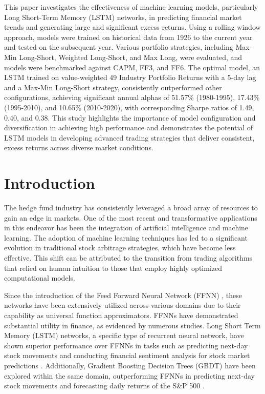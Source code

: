 \documentclass{article}
\begin{document}
This paper investigates the effectiveness of machine learning models, particularly Long Short-Term Memory (LSTM) networks, in predicting financial market trends and generating large and significant excess returns. Using a rolling window approach, models were trained on historical data from 1926 to the current year and tested on the subsequent year. Various portfolio strategies, including Max-Min Long-Short, Weighted Long-Short, and Max Long, were evaluated, and models were benchmarked against CAPM, FF3, and FF6. The optimal model, an LSTM trained on value-weighted 49 Industry Portfolio Returns with a 5-day lag and a Max-Min Long-Short strategy, consistently outperformed other configurations, achieving significant annual alphas of 51.57\% (1980-1995), 17.43\% (1995-2010), and 10.65\% (2010-2020), with corresponding Sharpe ratios of 1.49, 0.40, and 0.38. This study highlights the importance of model configuration and diversification in achieving high performance and demonstrates the potential of LSTM models in developing advanced trading strategies that deliver consistent, excess returns across diverse market conditions.

\medskip

\section{Introduction}
The hedge fund industry has consistently leveraged a broad array of resources to gain an edge in markets. One of the most recent and transformative applications in this endeavor has been the integration of artificial intelligence and machine learning. The adoption of machine learning techniques has led to a significant evolution in traditional stock arbitrage strategies, which have become less effective. This shift can be attributed to the transition from trading algorithms that relied on human intuition to those that employ highly optimized computational models.

Since the introduction of the Feed Forward Neural Network (FFNN) \cite{ffnn_orig}, these networks have been extensively utilized across various domains due to their capability as universal function approximators. FFNNs have demonstrated substantial utility in finance, as evidenced by numerous studies. Long Short Term Memory (LSTM) networks, a specific type of recurrent neural network, have shown superior performance over FFNNs in tasks such as predicting next-day stock movements \cite{fischer2018} and conducting financial sentiment analysis for stock market predictions \cite{eachempati}. Additionally, Gradient Boosting Decision Trees (GBDT) \cite{boosting-paper} have been explored within the same domain, outperforming FFNNs in predicting next-day stock movements \cite{weng2017} and forecasting daily returns of the S\&P 500 \cite{nevasalmi2020forecasting}.
\end{document}
